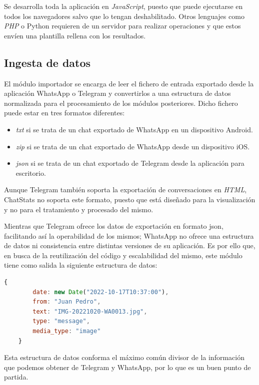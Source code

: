 Se desarrolla toda la aplicación en \textit{JavaScript}, puesto que puede ejecutarse en todos los navegadores salvo que lo tengan deshabilitado. Otros lenguajes como \textit{PHP} o Python requieren de un servidor para realizar operaciones y que estos envíen una plantilla rellena con los resultados.

\subsection{Ingesta de datos}
\label{chap:architecture_ingesta}

El módulo importador se encarga de leer el fichero de entrada exportado desde la aplicación WhatsApp o Telegram y convertirlos a una estructura de datos normalizada para el procesamiento de los módulos posteriores. Dicho fichero puede estar en tres formatos diferentes:

\begin{itemize}
	\item \textit{txt} si se trata de un chat exportado de WhatsApp en un dispositivo Android.
	\item \textit{zip} si se trata de un chat exportado de WhatsApp desde un dispositivo iOS.
	\item \textit{\acrshort{json}} si se trata de un chat exportado de Telegram desde la aplicación para escritorio.
\end{itemize}

Aunque Telegram también soporta la exportación de conversaciones en \textit{HTML}, ChatStats no soporta este formato, puesto que está diseñado para la visualización y no para el tratamiento y procesado del mismo.


Mientras que Telegram ofrece los datos de exportación en formato \acrshort{json}, facilitando así la operabilidad de los mismos; WhatsApp no ofrece una estructura de datos ni consistencia entre distintas versiones de su aplicación. Es por ello que, en busca de la reutilización del código y escalabilidad del mismo, este módulo tiene como salida la siguiente estructura de datos:

\begin{lstlisting}[language=JavaScript]
	{
		date: new Date("2022-10-17T10:37:00"),
		from: "Juan Pedro",
		text: "IMG-20221020-WA0013.jpg",
		type: "message",
		media_type: "image"
	}
\end{lstlisting}

Esta estructura de datos conforma el máximo común divisor de la información que podemos obtener de Telegram y WhatsApp, por lo que es un buen punto de partida.

